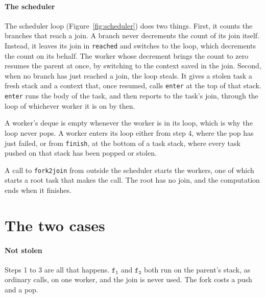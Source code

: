 \documentclass[sigplan,nonacm]{acmart}
\newcommand{\fo}{\mathtt{f_1}}
\newcommand{\ft}{\mathtt{f_2}}
\begin{document}
\paragraph{The scheduler}
%
The scheduler loop (Figure~\ref{fig:scheduler}) does two things.
%
First, it counts the branches that reach a join.
%
A branch never decrements the count of its join itself.
%
Instead, it leaves its join in \lstinline|reached| and switches to the
loop, which decrements the count on its behalf.
%
The worker whose decrement brings the count to zero resumes the parent
at once, by switching to the context saved in the join.
%
Second, when no branch has just reached a join, the loop steals.
%
It gives a stolen task a fresh stack and a context that, once resumed,
calls \lstinline|enter| at the top of that stack.
%
\lstinline|enter| runs the body of the task, and then reports to the
task's join, through the loop of whichever worker it is on by then.

A worker's deque is empty whenever the worker is in its loop, which is
why the loop never pops.
%
A worker enters its loop either from step 4, where the pop has just
failed, or from \lstinline|finish|, at the bottom of a task stack,
where every task pushed on that stack has been popped or stolen.

A call to \lstinline|fork2join| from outside the scheduler starts the
workers, one of which starts a root task that makes the call.
%
The root has no join, and the computation ends when it finishes.

\section{The two cases}
\label{sec:cases}

\paragraph{Not stolen}
%
Steps 1 to 3 are all that happens.
%
$\fo$ and $\ft$ both run on the parent's stack, as ordinary calls, on
one worker, and the join is never used.
%
The fork costs a push and a pop.
\end{document}
